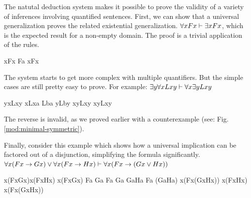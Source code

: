The natutal deduction system makes it possible to prove the validity of a
variety of inferences involving quantified sentences. First, we can show that
a universal generalization proves the related existential generalization.
$\forall xFx\vdash\exists xFx$, which is the expected result for a non-empty
domain. The proof is a trivial application of the rules.

\begin{fitchproof}
   {\eforall xFx} 
   {Fa}           
   {\eexists xFx} 
\end{fitchproof}

The system starts to get more complex with multiple quantifiers. But the simple
cases are still pretty easy to prove. For example:
$\exists y\forall xLxy\vdash\forall x\exists yLxy$

\begin{fitchproof}
   {\eexists y\eforall xLxy} 
  \open
   {\eforall xLxa}           
   {Lba}                     
   {\eexists yLby}           
   {\eforall x\eexists yLxy} 
  \close
   {\eforall x\eexists yLxy} 
\end{fitchproof}

The reverse is invalid, as we proved earlier with a counterexample (see: Fig.
\ref{mod:minimal-symmetric}).

Finally, consider this example which shows how a universal implication can be
factored out of a disjunction, simplifying the formula significantly.
$\forall x(Fx\rightarrow Gx)\vee\forall x(Fx\rightarrow Hx)\vdash
\forall x(Fx\rightarrow(Gx\vee Hx))$

\begin{fitchproof}
   {\eforall x(Fx\eif Gx)\eor\eforall x(Fx\eif Hx)} 
  \open
   {\eforall x(Fx\eif Gx)}                          
   {Fa \eif Ga}                                     
  \open
   {Fa}                                             
   {Ga}                                             
   {Ga\eor Ha}                                      
  \close
   {Fa \eif (Ga\eor Ha)}                              
   {\eforall x(Fx\eif(Gx\eor Hx))}                  
  \close
  \open
   {\eforall x(Fx\eif Hx)}                          
                                       
  \open
                                               
                                               
                                        
  \close
                                
                    
  \close
   {\eforall x(Fx\eif(Gx\eor Hx))}                 
\end{fitchproof}

